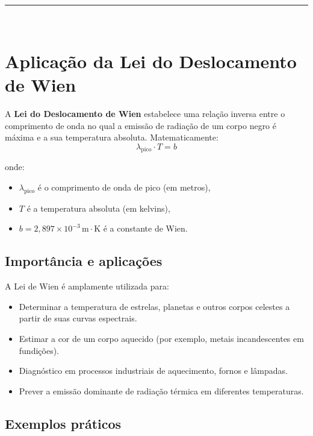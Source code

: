 \noindent\rule{\linewidth}{0.6pt}\\

\section*{Aplicação da Lei do Deslocamento de Wien}

A \textbf{Lei do Deslocamento de Wien} estabelece uma relação inversa entre o comprimento de onda no qual a emissão de radiação de um corpo negro é máxima e a sua temperatura absoluta. Matematicamente:
\[
\lambda_{\text{pico}} \cdot T = b
\]

onde:
\begin{itemize}
    \item \( \lambda_{\text{pico}} \) é o comprimento de onda de pico (em metros),
    \item \( T \) é a temperatura absoluta (em kelvins),
    \item \( b = 2,897 \times 10^{-3} \, \mathrm{m \cdot K} \) é a constante de Wien.
\end{itemize}

\subsection*{Importância e aplicações}

A Lei de Wien é amplamente utilizada para:
\begin{itemize}
    \item Determinar a temperatura de estrelas, planetas e outros corpos celestes a partir de suas curvas espectrais.
    \item Estimar a cor de um corpo aquecido (por exemplo, metais incandescentes em fundições).
    \item Diagnóstico em processos industriais de aquecimento, fornos e lâmpadas.
    \item Prever a emissão dominante de radiação térmica em diferentes temperaturas.
\end{itemize}

\subsection*{Exemplos práticos}

